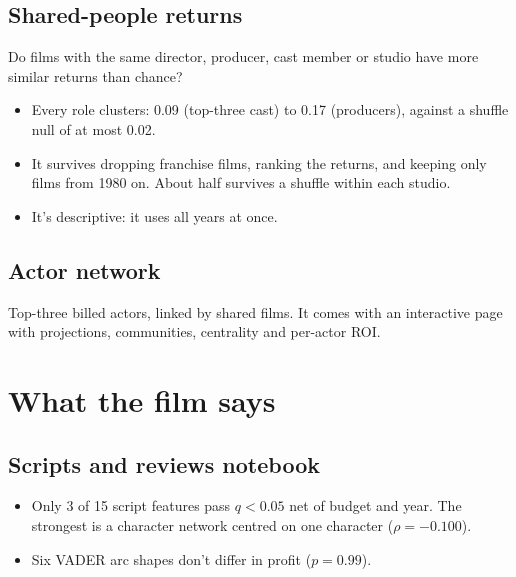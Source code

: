 \documentclass[10pt]{article}
\begin{document}
\subsection{Shared-people returns }
Do films with the same director, producer, cast member or studio have more similar returns than chance?
\begin{itemize}
  \item Every role clusters: 0.09 (top-three cast) to 0.17 (producers), against a shuffle null of at most 0.02.
  \item It survives dropping franchise films, ranking the returns, and keeping only films from 1980 on. About half survives a shuffle within each studio.
  \item It's descriptive: it uses all years at once.
\end{itemize}

\subsection{Actor network }
Top-three billed actors, linked by shared films. It comes with an interactive page with projections,
communities, centrality and per-actor ROI.

\section{What the film says}

\subsection{Scripts and reviews notebook }
\begin{itemize}
  \item Only 3 of 15 script features pass $q < 0.05$ net of budget and year. The strongest is a character network centred on one character ($\rho = -0.100$).
  \item Six VADER arc shapes don't differ in profit ($p = 0.99$).
\end{itemize}
\end{document}
